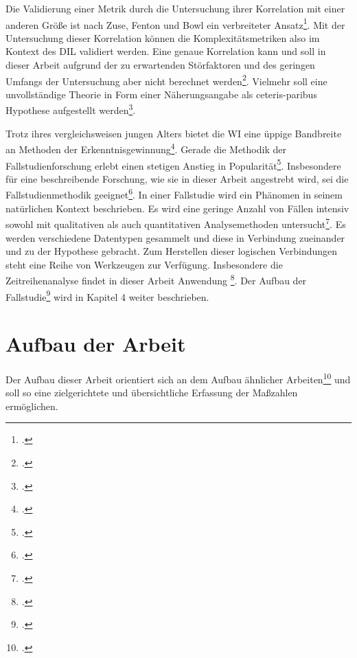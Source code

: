 Die Validierung einer Metrik durch die Untersuchung ihrer Korrelation
mit einer anderen Grö\ss e ist nach Zuse, Fenton und Bowl ein verbreiteter
Ansatz\footcite[Vgl. ][S. 561f]{zuseSoftwareComplexityMeasures1991}. Mit der Untersuchung dieser
Korrelation können die Komplexitätsmetriken also im Kontext des DIL
validiert werden. Eine genaue Korrelation kann und soll in dieser Arbeit
aufgrund der zu erwartenden Störfaktoren und des geringen Umfangs der
Untersuchung aber nicht berechnet werden\footcite[Vgl. ][S. 449]{jonesAppliedSoftwareMeasurement2008}.
Vielmehr soll eine unvollständige Theorie in Form einer Näherungsangabe
als ceteris-paribus Hypothese aufgestellt werden\footcite[Vgl. ][S. 3]{wildeMethodenspektrumWirtschaftsinformatikUberblick2006}.

Trotz ihres vergleichsweisen jungen Alters bietet die \ac{WI} eine üppige
Bandbreite an Methoden der Erkenntnisgewinnung\footcite[Vgl. ][S. 113]{heinrichForschungsmethodikIntegrationsdisziplinBeitrag2005}. Gerade die Methodik der Fallstudienforschung erlebt einen
stetigen Anstieg in Popularität\footcite[Vgl. ][S. 22]{yinCaseStudyResearch2014}. Insbesondere für eine beschreibende
Forschung, wie sie in dieser Arbeit angestrebt wird, sei die
Fallstudienmethodik geeignet\footcite[Vgl. ][S. 607]{dubeRigorInformationSystems2003}. In einer Fallstudie wird ein Phänomen in seinem natürlichen
Kontext beschrieben. Es wird eine geringe Anzahl von Fällen intensiv
sowohl mit qualitativen als auch quantitativen Analysemethoden
untersucht\footcite[Vgl. ][S. 7]{gothlichFallstudienAlsForschungsmethode2003}.
Es werden verschiedene Datentypen gesammelt und diese in Verbindung
zueinander und zu der Hypothese gebracht. Zum Herstellen dieser
logischen Verbindungen steht eine Reihe von Werkzeugen zur Verfügung.
Insbesondere die Zeitreihenanalyse findet in dieser Arbeit Anwendung
\footcite[Vgl. ][S. 6]{gothlichFallstudienAlsForschungsmethode2003}. Der Aufbau
der Fallstudie\footcite[Vgl. ][S.
8ff]{gothlichFallstudienAlsForschungsmethode2003} wird in Kapitel 4 weiter beschrieben.

\section{Aufbau der Arbeit}\label{aufbau-der-arbeit}

Der Aufbau dieser Arbeit orientiert sich an dem Aufbau ähnlicher
Arbeiten\footcite[Vgl. ][S. 260]{aleneziEmpiricalAnalysisComplexity2015} und soll so eine zielgerichtete und
übersichtliche Erfassung der Ma\ss zahlen ermöglichen.

